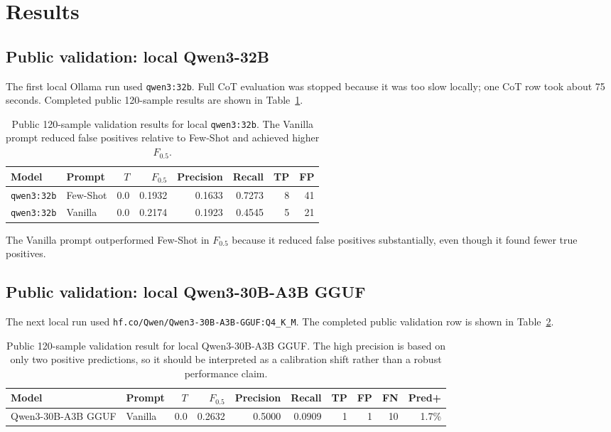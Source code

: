 \documentclass{article}
\begin{document}
\section{Results}

\subsection{Public validation: local Qwen3-32B}

The first local Ollama run used \texttt{qwen3:32b}. Full CoT evaluation was
stopped because it was too slow locally; one CoT row took about 75 seconds.
Completed public 120-sample results are shown in Table~\ref{tab:qwen32}.

\begin{table}[t]
\caption{Public 120-sample validation results for local \texttt{qwen3:32b}. The Vanilla prompt reduced false positives relative to Few-Shot and achieved higher $F_{0.5}$.}
\label{tab:qwen32}
\centering
\begin{tabular}{llrrrrrr}
\toprule
Model & Prompt & $T$ & $F_{0.5}$ & Precision & Recall & TP & FP \\
\midrule
\texttt{qwen3:32b} & Few-Shot & 0.0 & 0.1932 & 0.1633 & 0.7273 & 8 & 41 \\
\texttt{qwen3:32b} & Vanilla  & 0.0 & 0.2174 & 0.1923 & 0.4545 & 5 & 21 \\
\bottomrule
\end{tabular}
\end{table}

The Vanilla prompt outperformed Few-Shot in $F_{0.5}$ because it reduced false
positives substantially, even though it found fewer true positives.

\subsection{Public validation: local Qwen3-30B-A3B GGUF}

The next local run used
\texttt{hf.co/Qwen/Qwen3-30B-A3B-GGUF:Q4\_K\_M}. The completed public
validation row is shown in Table~\ref{tab:qwen30}.

\begin{table}[t]
\caption{Public 120-sample validation result for local Qwen3-30B-A3B GGUF. The high precision is based on only two positive predictions, so it should be interpreted as a calibration shift rather than a robust performance claim.}
\label{tab:qwen30}
\centering
\begin{tabular}{llrrrrrrrr}
\toprule
Model & Prompt & $T$ & $F_{0.5}$ & Precision & Recall & TP & FP & FN & Pred+ \\
\midrule
Qwen3-30B-A3B GGUF & Vanilla & 0.0 & 0.2632 & 0.5000 & 0.0909 & 1 & 1 & 10 & 1.7\% \\
\bottomrule
\end{tabular}
\end{table}
\end{document}
